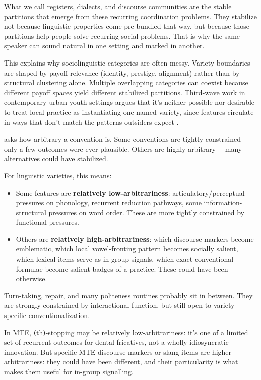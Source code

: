 \documentclass[11pt,letterpaper]{article}
\begin{document}
What we call registers, dialects, and discourse communities are the stable partitions that emerge from these recurring coordination problems. They stabilize not because linguistic properties come pre-bundled that way, but because those partitions help people solve recurring social problems. That is why the same speaker can sound natural in one setting and marked in another.

This explains why sociolinguistic categories are often messy. Variety boundaries are shaped by payoff relevance (identity, prestige, alignment) rather than by structural clustering alone. Multiple overlapping categories can coexist because different payoff spaces yield different stabilized partitions. Third-wave work in contemporary urban youth settings argues that it's neither possible nor desirable to treat local practice as instantiating one named variety, since features circulate in ways that don't match the patterns outsiders expect \citep[59]{drummond_schleef2016_identity}.

\textcite{oconnor2021-conventionality} asks how arbitrary a convention is. Some conventions are tightly constrained~-- only a few outcomes were ever plausible. Others are highly arbitrary~-- many alternatives could have stabilized.

For linguistic varieties, this means:
\begin{itemize}
    \item Some features are \textbf{relatively low-arbitrariness}: articulatory/perceptual pressures on phonology, recurrent reduction pathways, some information-structural pressures on word order. These are more tightly constrained by functional pressures.
    \item Others are \textbf{relatively high-arbitrariness}: which discourse markers become emblematic, which local vowel-fronting pattern becomes socially salient, which lexical items serve as in-group signals, which exact conventional formulae become salient badges of a practice. These could have been otherwise.
\end{itemize}

Turn-taking, repair, and many politeness routines probably sit in between. They are strongly constrained by interactional function, but still open to variety-specific conventionalization.

In MTE, ⟨th⟩-stopping may be relatively low-arbitrariness: it's one of a limited set of recurrent outcomes for dental fricatives, not a wholly idiosyncratic innovation. But specific MTE discourse markers or slang items are higher-arbitrariness: they could have been different, and their particularity is what makes them useful for in-group signalling.
\end{document}
